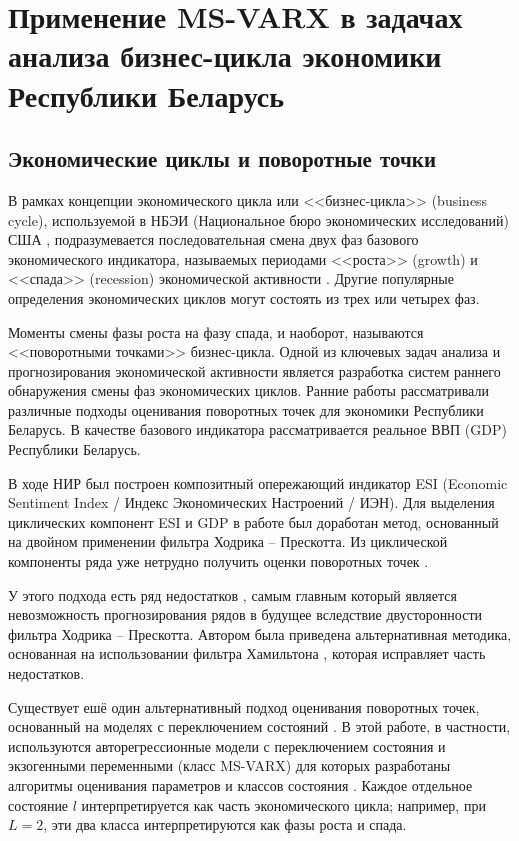 \documentclass[a4paper,14pt]{extreport}
\begin{document}
\chapter{Применение MS-VARX в задачах анализа бизнес-цикла экономики Республики Беларусь}

\label{chapter:msvarx_for_cycles}


\section{Экономические циклы и поворотные точки}

В рамках концепции экономического цикла или <<бизнес-цикла>> (business cycle), используемой в НБЭИ (Национальное бюро экономических исследований) США \cite{nberDevelopment}, подразумевается последовательная смена двух фаз базового экономического индикатора, называемых периодами <<роста>> (growth) и <<спада>> (recession) экономической активности \cite{oecdCycleExtraction}. Другие популярные определения экономических циклов могут состоять из трех или четырех фаз.

Моменты смены фазы роста на фазу спада, и наоборот, называются <<поворотными точками>> бизнес-цикла. Одной из ключевых задач анализа и прогнозирования экономической активности является разработка систем раннего обнаружения смены фаз экономических циклов.  Ранние работы \cite{esiMaking,esiExtra,mak_mal_bv_2018} рассматривали различные подходы оценивания поворотных точек для экономики Республики Беларусь. В качестве базового индикатора рассматривается реальное ВВП (GDP) Республики Беларусь.

В ходе НИР \cite{esiMaking} был построен композитный опережающий индикатор ESI (Economic Sentiment Index / Индекс Экономических Настроений / ИЭН). Для выделения циклических компонент ESI и GDP в работе был доработан метод, основанный на двойном применении фильтра Ходрика -- Прескотта. Из циклической компоненты ряда уже нетрудно получить оценки поворотных точек \cite{esiMaking,esiExtra}. 

У этого подхода есть ряд недостатков \cite{ham_never_hp}, самым главным который является невозможность прогнозирования рядов в будущее вследствие двусторонности фильтра Ходрика -- Прескотта. Автором была приведена альтернативная методика, основанная на использовании фильтра Хамильтона \cite{mak_mal_bv_2018}, которая исправляет часть недостатков.

Существует ешё один альтернативный подход оценивания поворотных точек, основанный на моделях с переключением состояний \cite{hamNewApproach}. В этой работе, в частности, используются авторегрессионные модели с переключением состояния и экзогенными переменными (класс MS-VARX) для которых разработаны алгоритмы оценивания параметров и классов состояния \cite{malNovopMSVARX,rs_persio2014,goutte_hal_00747479}. Каждое отдельное состояние $l$ интерпретируется как часть экономического цикла; например, при $L=2$, эти два класса интерпретируются как фазы роста и спада. 
\end{document}
